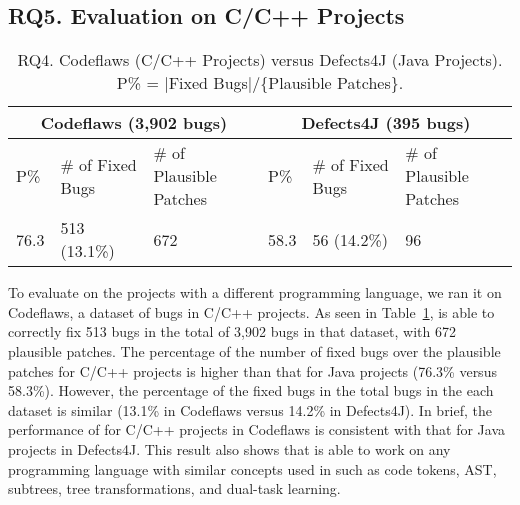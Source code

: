 \subsection{\bf RQ5. Evaluation on C/C++ Projects}
\label{sec:eval-c}

\begin{table}[t]
	\caption{RQ4. Codeflaws (C/C++ Projects) versus Defects4J (Java Projects). P\% = $|$Fixed Bugs$|$/\{Plausible Patches\}.}
	\vspace{-5pt}
	{\footnotesize
		\begin{center}
			\tabcolsep 2.7pt
			\begin{tabular}{p{0.5cm}<{\centering}|p{1.5cm}<{\centering}|p{1.55cm}<{\centering}|p{0.5cm}<{\centering}|p{1.5cm}<{\centering}|p{1.55cm}<{\centering}}\hline	
				
				\multicolumn{3}{c|}{Codeflaws (3,902 bugs)} & \multicolumn{3}{c}{Defects4J (395 bugs)}\\\hline
				 P\%& \# of Fixed Bugs& \# of Plausible Patches &P\%& \# of Fixed Bugs & \# of Plausible Patches \\ \hline
				
				  76.3  &        513 (13.1\%)      &            672             &  58.3 &          56 (14.2\%)       &        96                 \\
				\hline

			\end{tabular}
			\label{RQ5}
		\end{center}
	}
\end{table}
  
To evaluate {\tool} on the projects with a different programming
language, we ran it on Codeflaws, a dataset of bugs in C/C++ projects.
As seen in Table~\ref{RQ5}, {\tool} is able to correctly fix 513 bugs
in the total of 3,902 bugs in that dataset, with 672 plausible
patches. The percentage of the number of fixed bugs over the plausible
patches for C/C++ projects is higher than that for Java projects
(76.3\% versus 58.3\%). However, the percentage of the fixed bugs in
the total bugs in the each dataset is similar (13.1\% in Codeflaws
versus 14.2\% in Defects4J). In brief, the performance of {\tool} for
C/C++ projects in Codeflaws is consistent with that for Java projects
in Defects4J. This result also shows that {\tool} is able to work on
any programming language with similar concepts used in {\tool} such as
code tokens, AST, subtrees, tree transformations, and dual-task learning.







